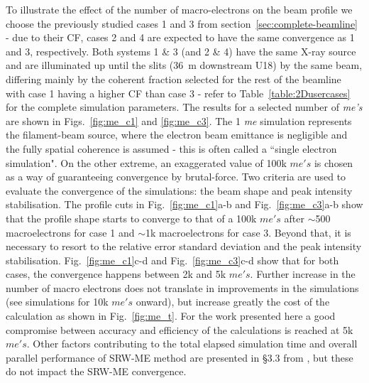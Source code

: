 \documentclass{iucr}              %
\begin{document}
To illustrate the effect of the number of macro-electrons on the beam profile we choose the previously studied cases 1 and 3 from section~\ref{sec:complete-beamline} - due to their CF, cases 2 and 4 are expected to have the same convergence as 1 and 3, respectively. Both systems 1 \& 3 (and 2 \& 4) have the same X-ray source and are illuminated up until the slits (\SI{36}{\meter} downstream U18) by the same beam, differing mainly by the coherent fraction selected for the rest of the beamline with case 1 having a higher CF than case 3 - refer to Table~\ref{table:2Dusercases} for the complete simulation parameters. The results for a selected number of \textit{me's} are shown in Figs.~\ref{fig:me_c1} and \ref{fig:me_c3}. The 1 \textit{me} simulation represents the filament-beam source, where the electron beam emittance is negligible and the fully spatial coherence is assumed - this is often called a ``single electron simulation". On the other extreme, an exaggerated value of 100k $me's$ is chosen as a way of guaranteeing convergence by brutal-force. Two criteria are used to evaluate the convergence of the simulations: the beam shape and peak intensity stabilisation. The profile cuts in  Fig.~\ref{fig:me_c1}a-b and Fig.~\ref{fig:me_c3}a-b show that the profile shape starts to converge to that of a 100k $me's$ after $\sim$500 macroelectrons for case 1 and $\sim$1k macroelectrons for case 3. Beyond that, it is necessary to resort to the relative error standard deviation and the peak intensity stabilisation. Fig.~\ref{fig:me_c1}c-d and Fig.~\ref{fig:me_c3}c-d show that for both cases, the convergence happens between 2k and 5k $me's$. Further increase in the number of macro electrons does not translate in improvements in the simulations (see simulations for 10k $me's$ onward), but increase greatly the cost of the calculation as shown in Fig.~\ref{fig:me_t}. For the work presented here a good compromise between accuracy and efficiency of the calculations is reached at 5k $me's$. Other factors contributing to the total elapsed simulation time and overall parallel performance of SRW-ME method are presented in \S3.3 from \cite{codeSRW_MEscan}, but these do not impact the SRW-ME convergence.
\end{document}
